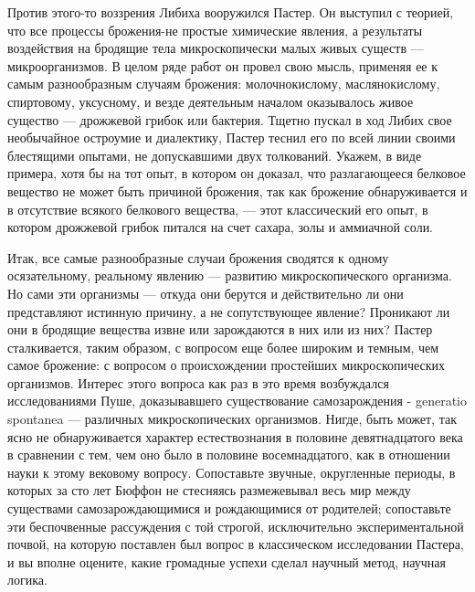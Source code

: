 Против этого-то  воззрения  Либиха  вооружился  Пастер.  Он  выступил  с
теорией, что  все процессы  брожения-не  простые химические  явления,  а
результаты воздействия  на  бродящие тела  микроскопически  малых  живых
существ ---  микроорганизмов. В  целом ряде  работ он  провел свою  мысль,
применяя ее  к  самым разнообразным  случаям  брожения:  молочнокислому,
маслянокислому,  спиртовому,  уксусному,  и  везде  деятельным   началом
оказывалось живое  существо  ---  дрожжевой грибок  или  бактерия.  Тщетно
пускал в  ход  Либих свое  необычайное  остроумие и  диалектику,  Пастер
теснил его по всей линии своими блестящими опытами, не допускавшими двух
толкований. Укажем, в виде  примера, хотя бы на  тот опыт, в котором  он
доказал, что  разлагающееся белковое  вещество  не может  быть  причиной
брожения,  так  как  брожение  обнаруживается  и  в  отсутствие  всякого
белкового вещества, ---  этот классический его  опыт, в котором  дрожжевой
грибок питался на счет сахара, золы и аммиачной соли.

Итак,  все  самые  разнообразные  случаи  брожения  сводятся  к   одному
осязательному, реальному явлению --- развитию микроскопического организма.
Но сами  эти организмы  ---  откуда они  берутся  и действительно  ли  они
представляют истинную причину, а не сопутствующее явление? Проникают  ли
они в бродящие вещества извне или  зарождаются в них или из них?  Пастер
сталкивается, таким образом, с вопросом еще более широким и темным,  чем
самое брожение: с вопросом  о происхождении простейших  микроскопических
организмов. Интерес  этого  вопроса  как раз  в  это  время  возбуждался
исследованиями  Пуше,  доказывавшего   существование  самозарождения   -
generatio spontanea --- различных микроскопических организмов. Нигде, быть
может, так  ясно не  обнаруживается характер  естествознания в  половине
девятнадцатого  века  в  сравнении  с  тем,  чем  оно  было  в  половине
восемнадцатого,  как  в  отношении  науки  к  этому  вековому   вопросу.
Сопоставьте звучные, округленные периоды, в которых за сто лет Бюффон не
стесняясь размежевывал весь  мир между  существами самозарождающимися  и
рождающимися от родителей;  сопоставьте эти  беспочвенные рассуждения  с
той  строгой,   исключительно  экспериментальной   почвой,  на   которую
поставлен был вопрос  в классическом исследовании  Пастера, и вы  вполне
оцените, какие громадные успехи сделал научный метод, научная логика.

